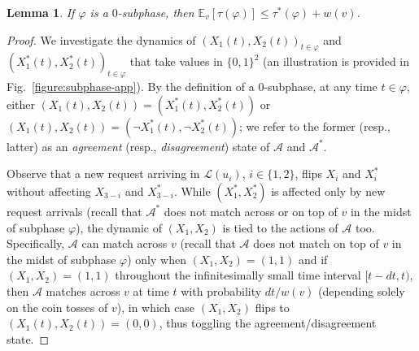 \documentclass[11pt]{article}
\def\ShortVersion{}
\def\ShortVersionEnd{}
\newtheorem{lemma}[theorem]{Lemma}
\theoremstyle{definition}
\theoremstyle{plain}
\newtheorem{lemma}[theorem]{Lemma}
\theoremstyle{definition}
\theoremstyle{plain}
\newtheorem{lemma}{Lemma}[section]
\theoremstyle{definition}
\theoremstyle{plain}
\newcommand{\Fig}{Fig.}
\newcommand{\Expect}{\mathbb{E}}
\newcommand{\Leaves}{\mathcal{L}}
\newcommand{\A}{\mathcal{A}}
\newcommand{\adv}[1]{{#1}^{*}}
\begin{document}
\begin{lemma} \label{lemma:bound-time-cost-0-subphase}
If $\varphi$ is a $0$-subphase, then
$\Expect_{v}[\tau(\varphi)]
\leq
\adv{\tau}(\varphi) + w(v)$.
\end{lemma}
%
\ShortVersion \sloppy \ShortVersionEnd
\begin{proof}
We investigate the dynamics of
$(X_{1}(t), X_{2}(t))_{t \in \varphi}$
and
$(\adv{X}_{1}(t), \adv{X}_{2}(t))_{t \in \varphi}$
that take values in
$\{ 0, 1 \}^{2}$
(an illustration is provided in \Fig{}~\ref{figure:subphase-app}).
By the definition of a $0$-subphase, at any time
$t \in \varphi$,
either
$(X_{1}(t), X_{2}(t)) = (\adv{X}_{1}(t), \adv{X}_{2}(t))$
or
$(X_{1}(t), X_{2}(t)) = (\neg\adv{X}_{1}(t), \neg\adv{X}_{2}(t))$;
we refer to the former (resp., latter) as an \emph{agreement} (resp.,
\emph{disagreement}) state of $\A$ and $\adv{\A}$.

Observe that a new request arriving in $\Leaves(u_{i})$, $i \in \{ 1, 2 \}$,
flips $X_{i}$ and $\adv{X}_{i}$ without affecting $X_{3 - i}$ and $\adv{X}_{3
- i}$.
While $(\adv{X}_{1}, \adv{X}_{2})$ is affected only by new request arrivals
(recall that $\adv{\A}$ does not match across or on top of $v$ in the midst of
subphase $\varphi$), the dynamic of $(X_{1}, X_{2})$ is tied to the actions of
$\A$ too.
Specifically, $\A$ can match across $v$ (recall that $\A$ does not match on
top of $v$ in the midst of subphase $\varphi$) only when
$(X_{1}, X_{2}) = (1, 1)$
and if 
$(X_{1}, X_{2}) = (1, 1)$
throughout the infinitesimally small time interval
$[t - d t, t)$,
then $\A$ matches across $v$ at time $t$ with probability
$d t / w(v)$
(depending solely on the coin tosses of $v$), in which case $(X_{1}, X_{2})$
flips to
$(X_{1}(t), X_{2}(t)) = (0, 0)$,
thus toggling the agreement/disagreement state.


\end{proof}
\end{document}
